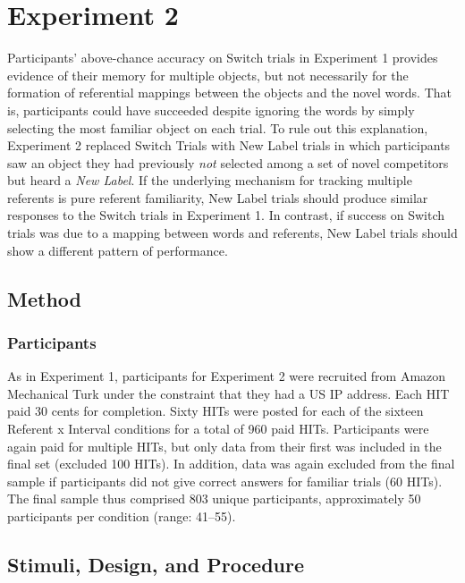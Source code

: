 \documentclass[man,floatsintext]{apa6}
\begin{document}

\section{Experiment 2}

Participants' above-chance accuracy on Switch trials in Experiment 1 provides evidence of their memory for multiple objects, but not necessarily for the formation of referential mappings between the objects and the novel words. That is, participants could have succeeded despite ignoring the words by simply selecting the most familiar object on each trial. To rule out this explanation, Experiment 2 replaced Switch Trials with New Label trials in which participants saw an object they had previously \emph{not} selected among a set of novel competitors but heard a \emph{New Label}.
If the underlying mechanism for tracking multiple referents is pure referent familiarity, New Label trials should produce similar responses to the Switch trials in Experiment 1. In contrast, if success on Switch trials was due to a mapping between words and referents, New Label trials should show a different pattern of performance.

\subsection{Method}

\subsubsection{Participants}

As in Experiment 1, participants for Experiment 2 were recruited from Amazon Mechanical Turk under the constraint that they had a US IP address. Each HIT paid 30 cents for completion. Sixty HITs were posted for each of the sixteen Referent x Interval conditions for a total of 960 paid HITs. Participants were again paid for multiple HITs, but only data from their first was included in the final set (excluded 100 HITs). In addition, data was again excluded from the final sample if participants did not give correct answers for familiar trials (60 HITs). The final sample thus comprised 803 unique participants, approximately 50 participants per condition (range: 41--55).

\subsection{Stimuli, Design, and Procedure}
\end{document}
